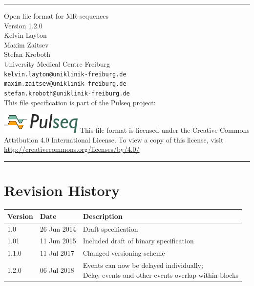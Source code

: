 \documentclass{article}
\date{}
\author{}
\def\myversionmajor{1}
\def\myversionminor{2}
\def\myversionrevision{0}
\def\myversion{\myversionmajor.\myversionminor.\myversionrevision }
\begin{document}
\begin{titlepage}
\begin{centering}
\rule{\textwidth}{5pt}\vskip1cm
\Huge{Open file format for MR sequences \\}
\vspace{1cm}
\LARGE{Version \myversion\\}
\vspace{1cm}
\large Kelvin Layton\\ Maxim Zaitsev\\ Stefan Kroboth\\
\vspace{1cm}
\large University Medical Centre Freiburg \\%
 \verb+kelvin.layton@uniklinik-freiburg.de+\\%
 \verb+maxim.zaitsev@uniklinik-freiburg.de+\\%
 \verb+stefan.kroboth@uniklinik-freiburg.de+\\%
 \vspace{1cm}
 This file specification is part of the Pulseq project:
 \vspace{0.5cm}

 \href{http://pulseq.github.io/}{\includegraphics[width=0.3\textwidth]{logo}}
 \vfill
\small This file format is licensed under the Creative Commons Attribution 4.0 International License. To view a copy of this license, visit \url{ http://creativecommons.org/licenses/by/4.0/ }\\
\rule{\textwidth}{5pt}
\end{centering}
\end{titlepage}

\newpage

\setlength\parindent{0pt}
\setlength{\parskip}{0.4\baselineskip}%

\tableofcontents

\setlength\parindent{0pt}
\setlength{\parskip}{\baselineskip}%

\newpage
\section*{Revision History}
\begin{tabular}{lll}
\toprule
Version & Date & Description \\
\midrule
1.0 & 26 Jun 2014 & Draft specification \\
1.01 & 11 Jun 2015 & Included draft of binary specification \\
1.1.0 & 11 Jul 2017 & Changed versioning scheme \\
1.2.0 & 06 Jul 2018 & \makecell{Events can now be delayed individually; \\ Delay events and other events overlap within blocks} \\
\bottomrule
\end{tabular}
\end{document}

